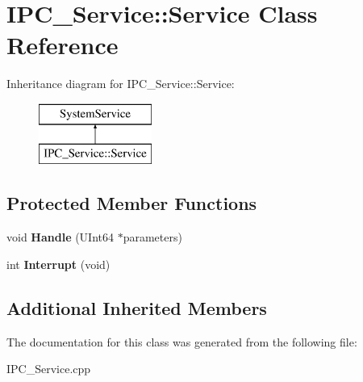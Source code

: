 \hypertarget{class_i_p_c___service_1_1_service}{}\section{I\+P\+C\+\_\+\+Service\+:\+:Service Class Reference}
\label{class_i_p_c___service_1_1_service}
Inheritance diagram for I\+P\+C\+\_\+\+Service\+:\+:Service\+:\begin{figure}[H]
\begin{center}
\leavevmode
\includegraphics[height=2.000000cm]{class_i_p_c___service_1_1_service}
\end{center}
\end{figure}
\subsection*{Protected Member Functions}
\begin{DoxyCompactItemize}
\item 
\mbox{\label{class_i_p_c___service_1_1_service_a63c9d060bcff34dbbc2f59f86dfb2377}} 
void {\bfseries Handle} (U\+Int64 $\ast$parameters)
\item 
\mbox{\label{class_i_p_c___service_1_1_service_a7ba241a58a7682040677fcd02a00892e}} 
int {\bfseries Interrupt} (void)
\end{DoxyCompactItemize}
\subsection*{Additional Inherited Members}


The documentation for this class was generated from the following file\+:\begin{DoxyCompactItemize}
\item 
I\+P\+C\+\_\+\+Service.\+cpp\end{DoxyCompactItemize}
